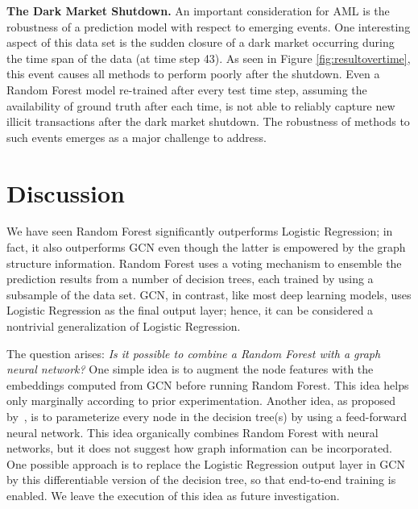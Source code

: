\documentclass[sigconf,submission]{acmart}
\begin{document}
\textbf{The Dark Market Shutdown.} 
An important consideration for AML is the robustness of a prediction model with respect to emerging events. One interesting aspect of this data set is the sudden closure of a dark market occurring during the time span of the data (at time step 43). As seen in Figure \ref{fig:resultovertime}, this event causes all methods to perform poorly after the shutdown. Even a Random Forest model re-trained after every test time step, assuming the availability of ground truth after each time, is not able to reliably capture new illicit transactions after the dark market shutdown. The robustness of methods to such events emerges as a major challenge to address.







\section{Discussion}
We have seen Random Forest significantly outperforms Logistic Regression; in fact, it also outperforms GCN even though the latter is empowered by the graph structure information. Random Forest uses a voting mechanism to ensemble the prediction results from a number of decision trees, each trained by using a subsample of the data set. GCN, in contrast, like most deep learning models, uses Logistic Regression as the final output layer; hence, it can be considered a nontrivial generalization of Logistic Regression.

The question arises: \textit{Is it possible to combine a Random Forest with a graph neural network?} One simple idea is to augment the node features with the embeddings computed from GCN before running Random Forest. This idea helps only marginally according to prior experimentation. Another idea, as proposed by~\cite{Kontschieder2015}, is to parameterize every node in the decision tree(s) by using a feed-forward neural network. This idea organically combines Random Forest with neural networks, but it does not suggest how graph information can be incorporated. One possible approach is to replace the Logistic Regression output layer in GCN by this differentiable version of the decision tree, so that end-to-end training is enabled. We leave the execution of this idea as future investigation.
\end{document}
